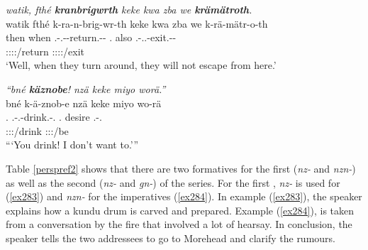 \begin{exe}
	\ex \emph{watik, fthé \textbf{kranbrigwrth} keke kwa zba we \textbf{krämätroth}.}\\
	\glll watik fthé k-ra-n-brig-wr-th keke kwa zba we k-rä-mätr-o-th\\
	then when \M.\Bet-\Irr.\Vc-\Venit-return.\Ext-\Ndu-\Stnsg{} \Neg{} \Fut{} \Prox.\Abl{} also \M.\Bet-\Irr.\Vc.\Ndu-exit.\Rs-\Andat-\Stnsg{}\\
	{} {} \footnotesize{\Stpl:\Sbj:\Irr:\Ipfv:\Venit/return} {} {} {} {} \footnotesize{\Stpl:\Sbj:\Irr:\Pfv:\Andat/exit}\\
	\trans `Well, when they turn around, they will not escape from here.'\\
	\label{ex330}
\end{exe}
\begin{exe}
	\ex \emph{``bné \textbf{käznobe}! nzä keke miyo worä.''}\\
	\glll bné k-ä-znob-e nzä keke miyo wo-rä\\
	\Snsg.\Erg{} \M.\Bet-\Ndu.\Vc-drink.\Rs-\Snsg.\Imp{} \Fsg.\Abs{} \Neg{} desire \Fsg.\Alph-\Cop.\Ndu\\
	{} \footnotesize{\Spl:\Sbj:\Imp:\Pfv/drink} {} {} {} \footnotesize{\Fsg:\Sbj:\Nonpast:\Ipfv/be}\\
	\trans ```You drink! I don't want to.'''
	\label{ex278}
\end{exe}

Table \ref{perspref2} shows that there are two formatives for the first  (\emph{nz-} and \emph{nzn-}) as well as the second  (\emph{nz-} and \emph{gn-}) of the \Bet{} series. For the first  , \emph{nz-} is used for  (\ref{ex283}) and \emph{nzn-} for the imperatives (\ref{ex284}). In example (\ref{ex283}), the speaker explains how a kundu drum is carved and prepared. Example (\ref{ex284}), is taken from a conversation by the fire that involved a lot of hearsay. In conclusion, the speaker tells the two addressees to go to Morehead and clarify the rumours.

